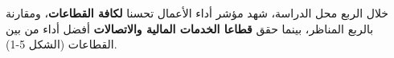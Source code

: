 خلال الربع محل الدراسة، شهد مؤشر أداء الأعمال تحسنا \textbf{لكافة القطاعات}، ومقارنة بالربع المناظر، بينما حقق \textbf{قطاعا الخدمات المالية والاتصالات} أفضل أداء من بين القطاعات (الشكل 5-1).

